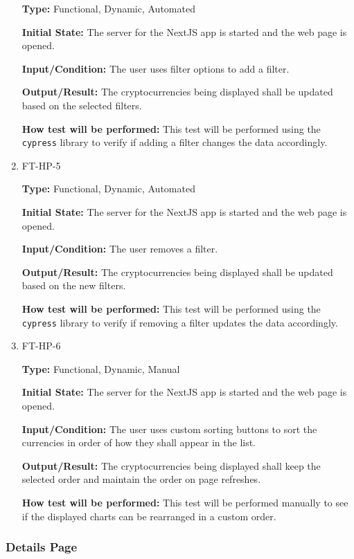 \documentclass[12pt, titlepage]{article}
\begin{document}
\begin{enumerate}
\textbf{Type:} Functional, Dynamic, Automated
					
\textbf{Initial State:} The server for the NextJS app is started and the web page is opened.
					
\textbf{Input/Condition:} The user uses filter options to add a filter.
					
\textbf{Output/Result:} The cryptocurrencies being displayed shall be updated based on the selected filters.
					
\textbf{How test will be performed:} This test will be performed using the \texttt{cypress} library to verify if adding a filter changes the data accordingly.

\item{FT-HP-5}

\textbf{Type:} Functional, Dynamic, Automated
					
\textbf{Initial State:} The server for the NextJS app is started and the web page is opened.
					
\textbf{Input/Condition:} The user removes a filter.
					
\textbf{Output/Result:} The cryptocurrencies being displayed shall be updated based on the new filters.
					
\textbf{How test will be performed:} This test will be performed using the \texttt{cypress} library to verify if removing a filter updates the data accordingly.

\item{FT-HP-6}

\textbf{Type:} Functional, Dynamic, Manual
					
\textbf{Initial State:} The server for the NextJS app is started and the web page is opened.
					
\textbf{Input/Condition:} The user uses custom sorting buttons to sort the currencies in order of how they shall appear in the list.
					
\textbf{Output/Result:} The cryptocurrencies being displayed shall keep the selected order and maintain the order on page refreshes.
					
\textbf{How test will be performed:} This test will be performed manually to see if the displayed charts can be rearranged in a custom order.

\end{enumerate}

\subsubsection{Details Page}
		
\end{document}
